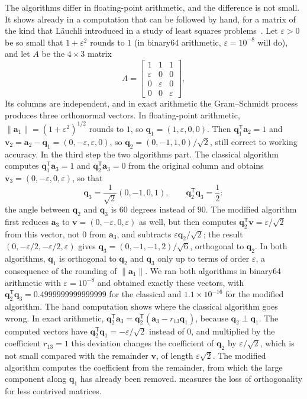 The algorithms differ in floating-point arithmetic, and the difference is not small. It shows already in a computation that can be followed by hand, for a matrix of the kind that L\"auchli introduced in a study of least squares problems~\cite{lauchli1961}. Let $\varepsilon>0$ be so small that $1+\varepsilon^2$ rounds to $1$ (in binary64 arithmetic, $\varepsilon=10^{-8}$ will do), and let $A$ be the $4\times3$ matrix
\[
A=\begin{bmatrix}1&1&1\\\varepsilon&0&0\\0&\varepsilon&0\\0&0&\varepsilon\end{bmatrix},
\]
Its columns are independent, and in exact arithmetic the Gram--Schmidt process produces three orthonormal vectors. In floating-point arithmetic, $\|\mathbf a_1\|=(1+\varepsilon^2)^{1/2}$ rounds to $1$, so $\mathbf q_1=(1,\varepsilon,0,0)$. Then $\mathbf q_1^{\mathsf T}\mathbf a_2=1$ and $\mathbf v_2=\mathbf a_2-\mathbf q_1=(0,-\varepsilon,\varepsilon,0)$, so $\mathbf q_2=(0,-1,1,0)/\sqrt2$, still correct to working accuracy. In the third step the two algorithms part. The classical algorithm computes $\mathbf q_1^{\mathsf T}\mathbf a_3=1$ and $\mathbf q_2^{\mathsf T}\mathbf a_3=0$ from the original column and obtains $\mathbf v_3=(0,-\varepsilon,0,\varepsilon)$, so that
\[
\mathbf q_3=\frac1{\sqrt2}(0,-1,0,1),\qquad\mathbf q_2^{\mathsf T}\mathbf q_3=\frac12 :
\]
the angle between $\mathbf q_2$ and $\mathbf q_3$ is $60$ degrees instead of $90$. The modified algorithm first reduces $\mathbf a_3$ to $\mathbf v=(0,-\varepsilon,0,\varepsilon)$ as well, but then computes $\mathbf q_2^{\mathsf T}\mathbf v=\varepsilon/\sqrt2$ from this vector, not $0$ from $\mathbf a_3$, and subtracts $\varepsilon\mathbf q_2/\sqrt2$; the result $(0,-\varepsilon/2,-\varepsilon/2,\varepsilon)$ gives $\mathbf q_3=(0,-1,-1,2)/\sqrt6$, orthogonal to $\mathbf q_2$. In both algorithms, $\mathbf q_1$ is orthogonal to $\mathbf q_2$ and $\mathbf q_3$ only up to terms of order $\varepsilon$, a consequence of the rounding of $\|\mathbf a_1\|$. We ran both algorithms in binary64 arithmetic with $\varepsilon=10^{-8}$ and obtained exactly these vectors, with $\mathbf q_2^{\mathsf T}\mathbf q_3=0.4999999999999999$ for the classical and $1.1\times10^{-16}$ for the modified algorithm. The hand computation shows where the classical algorithm goes wrong. In exact arithmetic, $\mathbf q_2^{\mathsf T}\mathbf a_3=\mathbf q_2^{\mathsf T}(\mathbf a_3-r_{13}\mathbf q_1)$, because $\mathbf q_2\perp\mathbf q_1$. The computed vectors have $\mathbf q_2^{\mathsf T}\mathbf q_1=-\varepsilon/\sqrt2$ instead of $0$, and multiplied by the coefficient $r_{13}=1$ this deviation changes the coefficient of $\mathbf q_2$ by $\varepsilon/\sqrt2$, which is not small compared with the remainder $\mathbf v$, of length $\varepsilon\sqrt2$. The modified algorithm computes the coefficient from the remainder, from which the large component along $\mathbf q_1$ has already been removed.  measures the loss of orthogonality for less contrived matrices.

